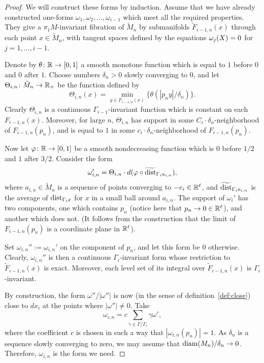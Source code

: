 \documentclass{amsart}
\begin{document}
\begin{proof}
We will construct these forms by induction.
Assume that we have already constructed one-forms
$\omega_1,\omega_2,\ldots, \omega_{i-1}$
which meet all the required properties.
They give a $\pi_1M$-invariant fibration of $\tilde M_n$ by submanifolds
$\tilde F_{i-1,n}(x)$ through each point $x\in \tilde M_n$, with
tangent spaces defined by the equations $\omega_j(X)\z=0$ for $j=1,\ldots,i-1$.

Denote by $\theta\colon {\Bbb R}\to [0,1]$
a smooth monotone function
which is equal to $1$ before $0$ and $0$ after $1$.
Choose numbers $\delta_n>0$ slowly converging to $0$,
and let $\Theta_{i,n}\colon \tilde M_n\z\to {\Bbb R}_+$ be the function defined by
$$\Theta_{i,n}(x)
=\min_{y\in F_{i-1,n}(x)}\{\theta(|p_n y|/\delta_n)\}.$$
Clearly $\Theta_{i,n}$ is a continuous $\Gamma_{i-1}$-invariant function
which is constant on each $F_{i-1,n}(x)$.
Moreover, for large $n$,
$\Theta_{i,n}$ has support in  some $C_i\cdot \delta_n$-neighborhood
of $F_{i-1,n}(p_n)$, and is equal to $1$
in some $c_i\cdot \delta_n$-neighborhood of $F_{i-1,n}(p_n)$.

Now let $\phi\colon {\Bbb R}\to [0,1]$
be a smooth nondecreasing function
which is $0$ before $1/2$ and $1$ after $3/2$.
Consider the form
$$\omega_{i,n}'=\Theta_{i,n}\cdot d(\phi\circ \widetilde\dist_{\Gamma_{i}a_{i,n}}),$$
where $a_{i,n}\in \tilde M_n$ is a sequence of points
converging to $ -e_i\in {\Bbb R}^\ell$,
and $\widetilde\dist_{\Gamma_{i}a_{i,n}}$ is the
average of $\dist_{\Gamma_{i}x}$ for $x$ in a small ball around $a_{i,n}$.
The support of $\omega_i'$ has two components,
one which  contains $ p_n$ (notice here that $p_n\to 0\in {\Bbb R}^\ell$),
and another which does not.
(It follows from the construction
that  the limit of $F_{i-1,n}(p_n)$ is a coordinate plane  in ${\Bbb R}^\ell$).

Set $\omega_{i,n}'':=\omega_{i,n}'$ on the component of $ p_n$,
and let this form be $0$ otherwise.
Clearly, $\omega_{i,n}''$ is then a continuous $\Gamma_{i}$-invariant form
whose restriction to ${\tilde F_{i-1,n}(x)}$ is exact.
Moreover, each level set of its integral over
${\tilde F_{i-1,n}(x)}$ is $\Gamma_{i}$-invariant.

By construction, the form $\omega''/|\omega''|$ is now
 (in the sense of definition~\ref{def:close})
close to $dx_i$  at the points where
$|\omega''|\not=0$.
Take
$$\omega_{i,n}=c\sum_{\gamma\in \Gamma/\Gamma_i} \gamma\omega',$$
where the coefficient $c$ is chosen in such a way that  $|\omega_{i,n}(p_n)|=1$.
As $\delta_n$ is a sequence slowly converging to zero,
we may assume that $\diam (M_n)/\delta_n\to 0$.
Therefore, $\omega_{i,n}$ is the form we need.
\end{proof}
\end{document}
